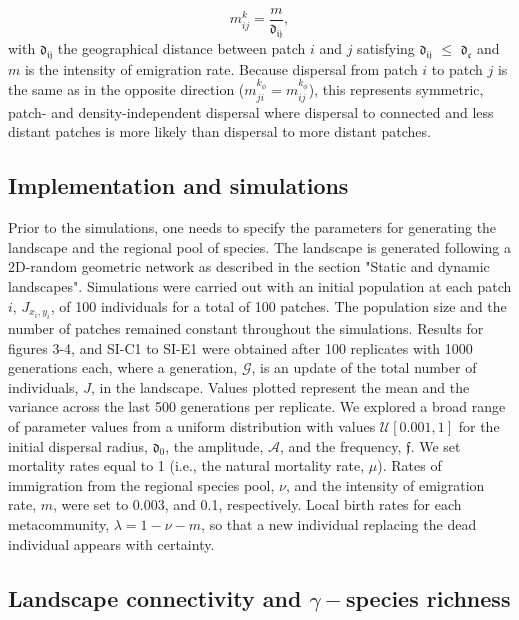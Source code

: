 \documentclass[12pt]{article}
\begin{document}
    \begin{equation}
      m_{ij}^{k} =  \frac{m}{\mathfrak{d_{ij}}},
    \label{neutdis}
    \end{equation}
    with $\mathfrak{d_{ij}}$ the geographical distance between patch $i$ and $j$ satisfying $\mathfrak{d_{ij}}$ $\leq$ $\mathfrak{d_{c}}$ and $m$ is the intensity of emigration rate. Because dispersal from patch $i$ to patch $j$ is the same as in the opposite direction ($m_{ji}^{k_{\phi}} = m_{ij}^{k_{\phi}}$), this represents symmetric, patch- and density-independent dispersal where dispersal to connected and less distant patches is more likely than dispersal to more distant patches.
    
    \subsection*{Implementation and simulations}
    
    Prior to the simulations, one needs to specify the parameters for generating the landscape and the regional pool of species. The landscape is generated following a 2D-random geometric network as described in the section "Static and dynamic landscapes". Simulations were carried out with an initial population at each patch $i$, $J_{x_i,y_i}$, of 100 individuals for a total of 100 patches. The population size and the number of patches remained constant throughout the simulations. Results for figures 3-4, and SI-C1 to SI-E1 were obtained after 100 replicates with 1000 generations each, where a generation, $\mathcal{G}$, is an update of the total number of individuals, $J$, in the landscape. Values plotted represent the mean and the variance across the last 500 generations per replicate. We explored a broad range of parameter values from a uniform distribution with values $\mathcal{U}[0.001,1]$ for the initial dispersal radius, $\mathfrak{d_{0}}$, the amplitude, $\mathcal{A}$, and the frequency, $\mathfrak{f}$. We set mortality rates equal to 1 (i.e., the natural mortality rate, $\mu$). Rates of immigration from the regional species pool, $\nu$, and the intensity of emigration rate, $m$, were set to 0.003, and 0.1, respectively. Local birth rates for each metacommunity, $\lambda = 1 - \nu - m$, so that a new individual replacing the dead individual appears with certainty.
    
    \subsection*{Landscape connectivity and $\gamma-$species richness}
    
\end{document}
